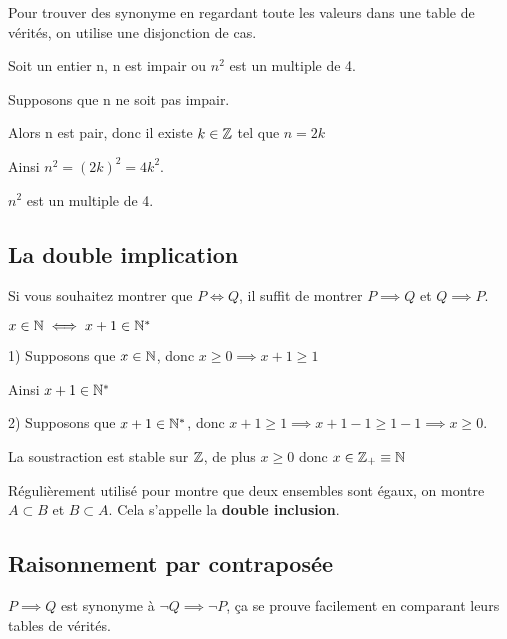 \documentclass[a4paper, 12pt]{article}
\begin{document}
\begin{remark}
    Pour trouver des synonyme en regardant toute les valeurs dans une table de vérités, on utilise une disjonction de cas.
\end{remark}

\begin{example}
    Soit un entier n, n est impair ou $n^2$ est un multiple de 4.

    \vspace{1em}

    Supposons que n ne soit pas impair.

    Alors n est pair, donc il existe $k \in \mathbb{Z}$ tel que $n = 2k$

    Ainsi $n^2 = (2k)^2 = 4k^2$.

    $n^2$ est un multiple de 4.
\end{example}

\subsection{La double implication}

Si vous souhaitez montrer que $P \iff Q$, il suffit de montrer $P \implies Q$ et $Q \implies P$.

\begin{example}
    $x \in \mathbb{N} \iff x + 1 \in \mathbb{N}^*$

    1) Supposons que $x \in \mathbb{N}$, donc $x \geq 0 \implies x + 1 \geq 1$

    Ainsi $x + 1 \in \mathbb{N}^*$

    2) Supposons que $x + 1 \in \mathbb{N}^*$, donc $x + 1 \geq 1 \implies x + 1 - 1 \geq 1 - 1 \implies x \geq 0$.

        La soustraction est stable sur $\mathbb{Z}$, de plus $x \geq 0$ donc $x \in \mathbb{Z}_+ \equiv \mathbb{N}$
\end{example}

\begin{remark}
    Régulièrement utilisé pour montre que deux ensembles sont égaux, on montre $A \subset B$ et $B \subset A$.
    Cela s'appelle la \textbf{double inclusion}.
\end{remark}

\subsection{Raisonnement par contraposée}

$P \implies Q$ est synonyme à $\neg Q \implies \neg P$, ça se prouve facilement en comparant leurs tables de vérités.
\end{document}
